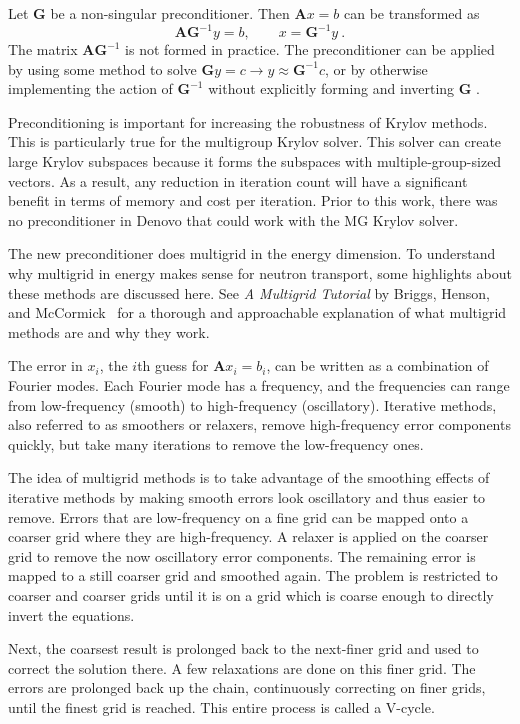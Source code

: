 \documentclass[preprint,12pt]{elsarticle}
\newcommand{\ve}[1]{\ensuremath{\mathbf{#1}}}
\begin{document}
Let $\ve{G}$ be a non-singular preconditioner. Then $\ve{A}x=b$ can be transformed as 
%
\begin{equation}
  \ve{AG}^{-1}y = b, \qquad  x = \ve{G}^{-1}y \:.
\end{equation}
%
The matrix $\ve{A}\ve{G}^{-1}$ is not formed in practice. The preconditioner can be applied by using some method to solve $\ve{G}y=c \to y \approx \ve{G}^{-1}c$, or by otherwise implementing the action of $\ve{G}^{-1}$ without explicitly forming and inverting $\ve{G}$ \cite{Benzi2002}.

Preconditioning is important for increasing the robustness of Krylov methods. This is particularly true for the multigroup Krylov solver. This solver can create large Krylov subspaces because it forms the subspaces with multiple-group-sized vectors. As a result, any reduction in iteration count will have a significant benefit in terms of memory and cost per iteration. Prior to this work, there was no preconditioner in Denovo that could work with the MG Krylov solver. 

The new preconditioner does multigrid in the energy dimension. To understand why multigrid in energy makes sense for neutron transport, some highlights about these methods are discussed here. See \emph{A Multigrid Tutorial} by Briggs, Henson, and McCormick~\cite{Briggs2000} for a thorough and approachable explanation of what multigrid methods are and why they work.

The error in $x_i$, the $i$th guess for $\ve{A}x_i=b_i$, can be written as a combination of Fourier modes. Each Fourier mode has a frequency, and the frequencies can range from low-frequency (smooth) to high-frequency (oscillatory). Iterative methods, also referred to as smoothers or relaxers, remove high-frequency error components quickly, but take many iterations to remove the low-frequency ones. 

The idea of multigrid methods is to take advantage of the smoothing effects of iterative methods by making smooth errors look oscillatory and thus easier to remove. Errors that are low-frequency on a fine grid can be mapped onto a coarser grid where they are high-frequency. A relaxer is applied on the coarser grid to remove the now oscillatory error components. The remaining error is mapped to a still coarser grid and smoothed again. The problem is restricted to coarser and coarser grids until it is on a grid which is coarse enough to directly invert the equations.

Next, the coarsest result is prolonged back to the next-finer grid and used to correct the solution there. A few relaxations are done on this finer grid. The errors are prolonged back up the chain, continuously correcting on finer grids, until the finest grid is reached. This entire process is called a V-cycle. 
\end{document}
